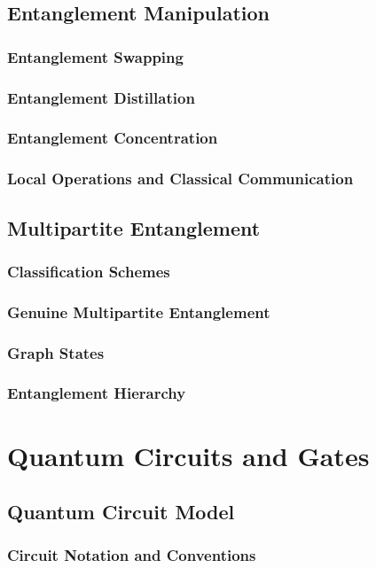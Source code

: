 \documentclass[12pt,a4paper]{book}
\begin{document}
\section{Entanglement Manipulation}
\subsection{Entanglement Swapping}
\subsection{Entanglement Distillation}
\subsection{Entanglement Concentration}
\subsection{Local Operations and Classical Communication}

\section{Multipartite Entanglement}
\subsection{Classification Schemes}
\subsection{Genuine Multipartite Entanglement}
\subsection{Graph States}
\subsection{Entanglement Hierarchy}

\chapter{Quantum Circuits and Gates}

\section{Quantum Circuit Model}
\subsection{Circuit Notation and Conventions}
\end{document}

